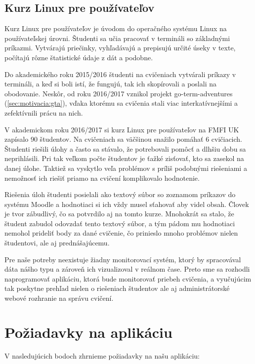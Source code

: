 \subsection{Kurz Linux pre používateľov}
\label{sec:motivacia:linuxforusers}

Kurz Linux pre používateľov je úvodom do operačného systému Linux
na používateľskej úrovni. Študenti sa učia pracovať v termináli so základnými
príkazmi. Vytvárajú priečinky, vyhľadávajú a prepisujú určité úseky v texte,
počítajú rôzne štatistické údaje z dát a podobne.

Do akademického roku 2015/2016 študenti na cvičeniach vytvárali príkazy v
termináli, a keď si boli istí, že fungujú, tak ich skopírovali a poslali na obodovanie.
Neskôr, od roku 2016/2017 vznikol projekt go-term-adventures (\ref{sec:motivacia:gta}), vďaka ktorému sa
cvičenia stali viac interkatívnejšími a zefektívnili prácu na nich.

V akademickom roku 2016/2017 si kurz Linux pre používateľov na FMFI UK zapísalo
90 študentov. Na cvičeniach sa väčšinou snažilo pomáhať 6 cvičiacich. Študenti riešili
úlohy a často sa stávalo, že potrebovali pomôcť a dlhšiu dobu sa neprihlásili.
Pri tak veľkom počte študentov je ťažké zisťovať, kto sa zasekol na danej úlohe.
Taktiež sa vyskytlo veľa problémov s príliš podobnými riešeniami a nemožnosť ich 
riešiť priamo na cvičení komplikovalo hodnotenie.

Riešenia úloh študenti posielali ako textový súbor so zoznamom príkazov do systému
Moodle a hodnotiaci si ich vždy musel sťahovať aby videl obsah. Človek je
tvor zábudlivý, čo sa potvrdilo aj na tomto kurze. Mnohokrát sa stalo, že študent
zabudol odovzdať tento textový súbor, a tým pádom mu hodnotiaci nemohol prideliť
body za dané cvičenie, čo prinieslo mnoho problémov nielen študentovi, ale aj
prednášajúcemu.

Pre naše potreby neexistuje žiadny monitorovací systém, ktorý by spracovával
dáta nášho typu a zároveň ich vizualizoval v reálnom čase. 
Preto sme sa rozhodli naprogramovať aplikáciu, ktorá bude
monitorovať priebeh cvičenia, a vyučujúcim tak poskytne prehľad nielen o riešeniach
študentov ale aj administrátorské webové rozhranie na správu cvičení.

\section{Požiadavky na aplikáciu}
\label{sec:apprequirements}

V nasledujúcich bodoch zhrnieme požiadavky na našu aplikáciu:

